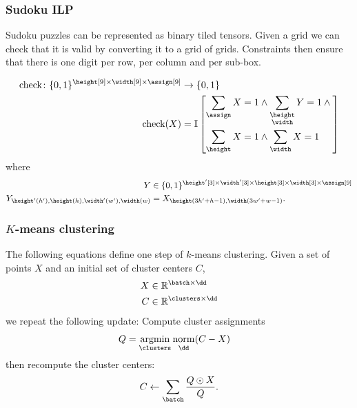 \documentclass{article}
\newcommand{\reals}{\mathbb{R}}
\begin{document}
\subsubsection{Sudoku ILP}


Sudoku puzzles can be represented as  binary tiled tensors.
Given a grid we can check that it is valid by converting it to a grid of grids. 
Constraints then ensure that there is one digit per row, per column and per sub-box.

\begin{align*}
\text{check} \colon \{0, 1\}^{\height[9] \times \width[9] \times \assign[9]} &\rightarrow \{0, 1\} \\
\text{check}(X) &=
\mathbb{I}\left[\begin{aligned}
\nsum{\assign} X = 1 &\land \nsum{\height \\ \width} Y = 1 \land {} \\
\nsum{\height} X = 1 &\land \nsum{\width} X = 1
\end{aligned}\right]
\end{align*}
where
\begin{align*}
Y &\in \{0, 1\}^{\height'[3] \times \width'[3] \times \height[3] \times \width[3] \times \assign[9]}  \\
Y_{\height'(h'), \height(h), \width'(w'), \width(w)} &= X_{\height(3h' + h-1), \width(3 w' + w-1)}.
\end{align*} 

\subsubsection{$K$-means clustering}


The following equations define one step of $k$-means clustering. Given a set of points $X$ and an initial set of cluster centers $C$,
\begin{align*}
  X &\in \reals^{\batch \times \dd} \\
C &\in \reals^{\clusters \times \dd}
\end{align*}
we repeat the following update: Compute cluster assignments
\begin{align*}
Q &= \nfun{\clusters}{argmin} \nfun{\dd}{norm}(C-X)
\end{align*}
then recompute the cluster centers:
\begin{equation*}
C \leftarrow \nsum{\batch} \frac{Q \odot X}{Q}.
\end{equation*}
\end{document}
